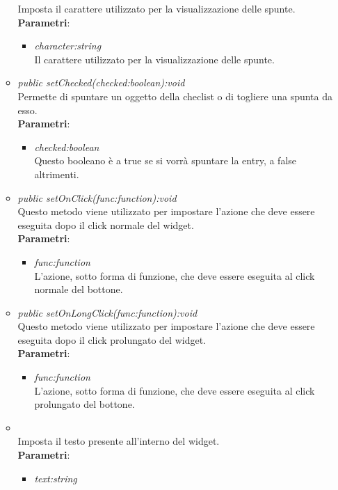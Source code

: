 \begin{itemize}
\begin{itemize}
	Imposta il carattere utilizzato per la visualizzazione delle spunte.
		\\ \textbf{Parametri}: \begin{itemize}
		\item \textit{character:string}\\
		Il carattere utilizzato per la visualizzazione delle spunte.
		\end{itemize} 
	\item \textit{public setChecked(checked:boolean):void}\\
	Permette di spuntare un oggetto della checlist o di togliere una spunta da esso.
		\\ \textbf{Parametri}: \begin{itemize}
		\item \textit{checked:boolean}\\
		Questo booleano è a true se si vorrà spuntare la entry, a false altrimenti.
		\end{itemize}  
	\item \textit{public setOnClick(func:function):void}\\
	Questo metodo viene utilizzato per impostare l'azione che deve essere eseguita dopo il click normale del widget.
		\\ \textbf{Parametri}: \begin{itemize}
		\item \textit{func:function}\\
		L'azione, sotto forma di funzione, che deve essere eseguita al click normale del bottone.
		\end{itemize}
	\item \textit{public setOnLongClick(func:function):void}\\
		Questo metodo viene utilizzato per impostare l'azione che deve essere eseguita dopo il click prolungato del widget.
		\\ \textbf{Parametri}: \begin{itemize}
		\item \textit{func:function}\\
		L'azione, sotto forma di funzione, che deve essere eseguita al click prolungato del bottone.
		\end{itemize}
	\item {}\\
	Imposta il testo presente all'interno del widget.
		\\ \textbf{Parametri}: \begin{itemize}
		\item \textit{text:string}\\

\end{itemize}
\end{itemize}
\end{itemize}
